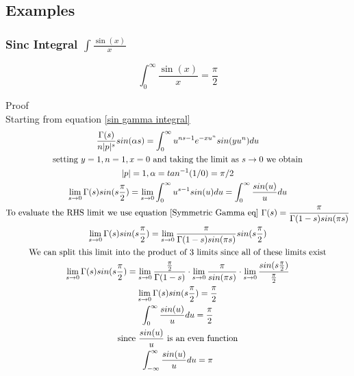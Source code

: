 \documentclass[a4paper]{article}
\begin{document}
\subsection{Examples}

\subsubsection{Sinc Integral $\int \frac{\sin(x)}{x}$}

\begin{theorem}
\begin{equation}
\boxed{
\int_{0}^{\infty} \frac{\sin(x)}{x} = \frac{\pi}{2}
}
\end{equation}

Proof
\\
Starting from equation \ref{sin gamma integral}
\begin{gather*}
\frac{\Gamma(s)}{n |p|^s} sin(\alpha s)= \int_{0}^{\infty} u^{ns -1} e^{-x u^{n}} sin(y u^n) du
\\
\text{setting $y=1, n=1, x=0$ and taking the limit as $s \to 0$ we obtain}
\\
|p| = 1, \alpha = tan^{-1}(1/0) = \pi/2
\\
\lim_{s \to 0} \Gamma(s) sin(s \frac{\pi}{2})= \lim_{s \to 0} \int_{0}^{\infty} u^{s -1} sin(u) du  = \int_{0}^{\infty} \frac{sin(u)}{u} du 
\\
\text{To evaluate the RHS limit we use equation \ref{Symmetric Gamma eq}  } \Gamma(s) = \frac{\pi}{\Gamma(1-s)sin(\pi s)}
\\
\lim_{s \to 0} \Gamma(s) sin(s \frac{\pi}{2})= \lim_{s \to 0} \frac{\pi}{\Gamma(1-s)sin(\pi s)} sin(s \frac{\pi}{2}) 
\\
\text{We can split this limit into the product of 3 limits since all of these limits exist}
\\
\lim_{s \to 0} \Gamma(s) sin(s \frac{\pi}{2})= \lim_{s \to 0}  \frac{\frac{\pi}{2}}{\Gamma(1-s)} \cdot 
\lim_{s \to 0}
\frac{\pi}{sin(\pi s)} 
\cdot 
\lim_{s \to 0}
\frac{sin(s \frac{\pi}{2})}{\frac{\pi}{2}}
\\
\lim_{s \to 0} \Gamma(s) sin(s \frac{\pi}{2})= \frac{\pi}{2}
\\
\int_{0}^{\infty} \frac{sin(u)}{u} du = \frac{\pi}{2}
\\
\text{since } \frac{sin(u)}{u} \text{ is an even function}
\\
\int_{-\infty}^{\infty} \frac{sin(u)}{u} du = \pi
\end{gather*}
\end{theorem}
\end{document}
